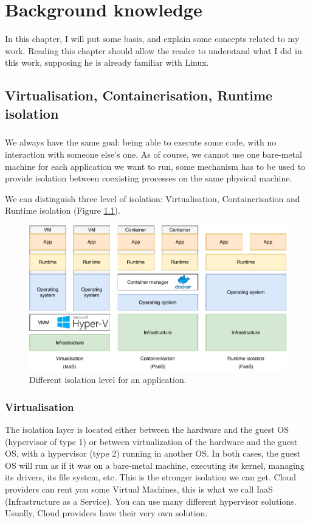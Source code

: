 \chapter{Background knowledge}

In this chapter, I will put some basis, and explain some concepts related to my work.  Reading this chapter should allow the reader to understand what I did in this work, supposing he is already familiar with Linux.

\section{Virtualisation, Containerisation, Runtime isolation}
\paragraph{}We always have the same goal: being able to execute some code, with no interaction with someone else's one.  As of course, we cannot use one bare-metal machine for each application we want to run, some mechanism has to be used to provide isolation between coexisting processes on the same physical machine.

We can distinguish three level of isolation: Virtualisation, Containerisation and Runtime isolation (Figure \ref{fig:virt-cont-runt}).
\begin{figure}
  \begin{center}
    \includegraphics[width=\linewidth]{images/Virt-Cont-Runt.pdf}
    \caption{Different isolation level for an application.}
    \label{fig:virt-cont-runt}
  \end{center}
\end{figure}
\subsection{Virtualisation}
The isolation layer is located either between the hardware and the guest OS (hypervisor of type 1) or between virtualization of the hardware and the guest OS, with a hypervisor (type 2) running in another OS.  In both cases, the guest OS will run as if it was on a bare-metal machine, executing its kernel, managing its drivers, its file system, etc.  This is the stronger isolation we can get.  Cloud providers can rent you some Virtual Machines, this is what we call IaaS (Infrastructure as a Service).  You can use many different hypervisor solutions. Usually, Cloud providers have their very own solution.
